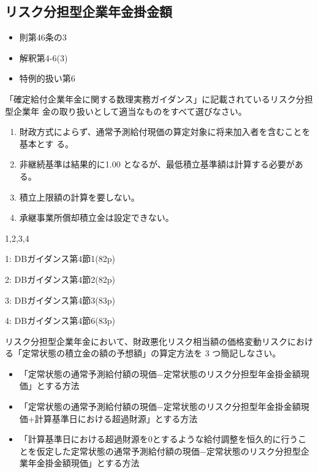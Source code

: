 \newpage

\subsection{リスク分担型企業年金掛金額}

\begin{InyouJobunbox}
  \begin{itemize}
    \item 則第46条の3
    \item 解釈第4-6(3)
    \item 特例的扱い第6
  \end{itemize}
\end{InyouJobunbox}


\begin{truefalse}[年金2 2021 問題1(1)\textcircled{1}]
  「確定給付企業年金に関する数理実務ガイダンス」に記載されているリスク分担型企業年
金の取り扱いとして適当なものをすべて選びなさい。
\begin{enumerate}
  \item 財政方式によらず、通常予測給付現価の算定対象に将来加入者を含むことを基本とす
る。
  \item 非継続基準は結果的に1.00 となるが、最低積立基準額は計算する必要がある。
  \item 積立上限額の計算を要しない。
  \item 承継事業所償却積立金は設定できない。
\end{enumerate}

\end{truefalse}

\begin{answerbox}
  1,2,3,4
\end{answerbox}

\begin{explanationbox}
1: DBガイダンス第4節1(82p)

2: DBガイダンス第4節2(82p)

3: DBガイダンス第4節3(83p)

4: DBガイダンス第4節6(83p)
\end{explanationbox}

\begin{shortanswer}[年金2 2020 問題2(2)]
  リスク分担型企業年金において、財政悪化リスク相当額の価格変動リスクにおける「定常状態の積立金の額の予想額」の算定方法を 3 つ簡記しなさい。
\end{shortanswer}

\begin{answerbox}
  \begin{itemize}
    \item 「定常状態の通常予測給付額の現価−定常状態のリスク分担型年金掛金額現価」とする方法
    \item 「定常状態の通常予測給付額の現価−定常状態のリスク分担型年金掛金額現価+計算基準日における超過財源」とする方法
    \item 「計算基準日における超過財源を0とするような給付調整を恒久的に行うことを仮定した定常状態の通常予測給付額の現価−定常状態のリスク分担型企業年金掛金額現価」とする方法
  \end{itemize}
\end{answerbox}


